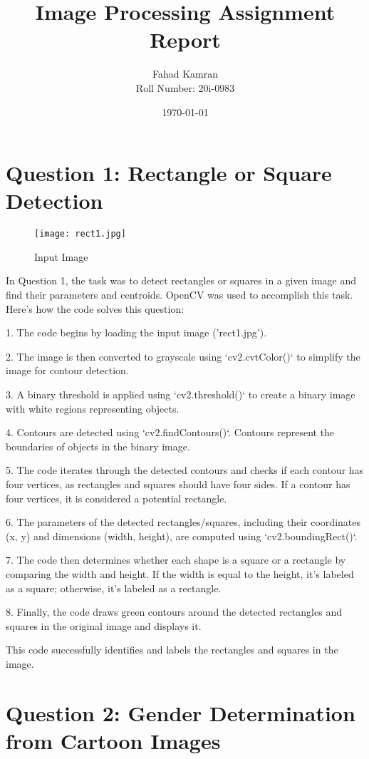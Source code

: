 \documentclass{article}
\title{Image Processing Assignment Report}
\author{Fahad Kamran \\ Roll Number: 20i-0983}
\date{\today}
\begin{document}
\maketitle

\section{Question 1: Rectangle or Square Detection}

\begin{figure}[ht]
    \centering
    \texttt{[image: rect1.jpg]}
    \caption{Input Image}
\end{figure}

In Question 1, the task was to detect rectangles or squares in a given image and find their parameters and centroids. OpenCV was used to accomplish this task. Here's how the code solves this question:

1. The code begins by loading the input image ('rect1.jpg').

2. The image is then converted to grayscale using `cv2.cvtColor()` to simplify the image for contour detection.

3. A binary threshold is applied using `cv2.threshold()` to create a binary image with white regions representing objects.

4. Contours are detected using `cv2.findContours()`. Contours represent the boundaries of objects in the binary image.

5. The code iterates through the detected contours and checks if each contour has four vertices, as rectangles and squares should have four sides. If a contour has four vertices, it is considered a potential rectangle.

6. The parameters of the detected rectangles/squares, including their coordinates (x, y) and dimensions (width, height), are computed using `cv2.boundingRect()`.

7. The code then determines whether each shape is a square or a rectangle by comparing the width and height. If the width is equal to the height, it's labeled as a square; otherwise, it's labeled as a rectangle.

8. Finally, the code draws green contours around the detected rectangles and squares in the original image and displays it.

This code successfully identifies and labels the rectangles and squares in the image.

\section{Question 2: Gender Determination from Cartoon Images}
\end{document}
